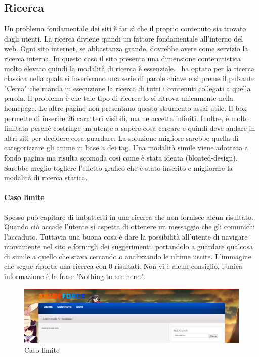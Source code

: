 \subsection{Ricerca} \label{Ricerca}
Un problema fondamentale dei siti è far sì che il proprio contenuto sia trovato dagli utenti. La ricerca diviene quindi un fattore fondamentale all'interno del web. Ogni sito internet, se abbastanza grande, dovrebbe avere come servizio la ricerca interna. In questo caso il sito presenta una dimensione  contenutistica molto elevato quindi la modalità di ricerca è essenziale.
\nomeSito\ ha optato per la ricerca classica nella quale si inseriscono una serie di parole chiave e si preme il pulsante "Cerca" che manda in esecuzione la ricerca di tutti i contenuti collegati a quella parola.
Il problema è che tale tipo di ricerca lo si ritrova unicamente nella homepage. Le altre pagine non presentano questo strumento assai utile. Il box permette di inserire 26 caratteri visibili, ma ne accetta infiniti. Inoltre, è molto limitata perché costringe un utente a sapere cosa cercare e quindi deve andare in altri siti per decidere cosa guardare. La soluzione migliore sarebbe quella di categorizzare gli anime in base a dei tag. Una modalità simile viene adottata a fondo pagina ma risulta scomoda così come è stata ideata (bloated-design). Sarebbe meglio togliere l'effetto grafico che è stato inserito e migliorare la modalità di ricerca statica.

\paragraph{Caso limite}
Spesso può capitare di imbattersi in una ricerca che non fornisce alcun risultato. Quando ciò accade l'utente si aspetta di ottenere un messaggio che gli comunichi l'accaduto. Tuttavia una buona cosa è dare la possibilità all'utente di navigare nuovamente nel sito e fornirgli dei suggerimenti, portandolo a guardare qualcosa di simile a quello che stava cercando o analizzando le ultime uscite. L'immagine che segue riporta una ricerca con 0 risultati. Non vi è alcun consiglio, l'unica informazione è  la frase "Nothing to see here.". 

\begin{figure}[H]
	\centering
	\includegraphics[width=1\textwidth]{img/CasoLimite.png}
	\caption{Caso limite} 
	\label{img5} 
\end{figure}
